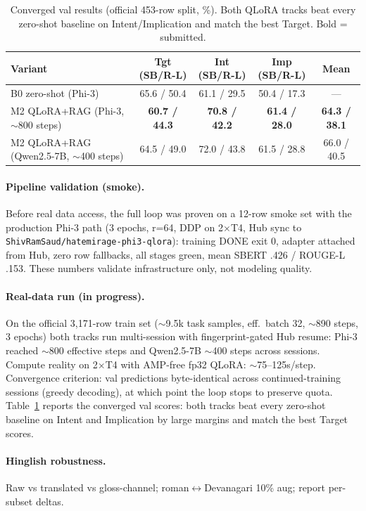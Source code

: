 \documentclass[11pt]{article}
\begin{document}
\begin{table}[t]
\centering
\small
\begin{tabular}{lcccc}
\toprule
Variant & Tgt (SB/R-L) & Int (SB/R-L) & Imp (SB/R-L) & Mean \\
\midrule
B0 zero-shot (Phi-3) & 65.6 / 50.4 & 61.1 / 29.5 & 50.4 / 17.3 & --- \\
M2 QLoRA+RAG (Phi-3, $\sim$800 steps) & \textbf{60.7 / 44.3} & \textbf{70.8 / 42.2} & \textbf{61.4 / 28.0} & \textbf{64.3 / 38.1} \\
M2 QLoRA+RAG (Qwen2.5-7B, $\sim$400 steps) & 64.5 / 49.0 & 72.0 / 43.8 & 61.5 / 28.8 & 66.0 / 40.5 \\
\bottomrule
\end{tabular}
\caption{Converged val results (official 453-row split, \%). Both QLoRA tracks beat every zero-shot baseline on Intent/Implication and match the best Target. Bold = submitted.}
\label{tab:abl}
\end{table}

\paragraph{Pipeline validation (smoke).}
Before real data access, the full loop was proven on a 12-row smoke set with the production Phi-3 path (3 epochs, r=64, DDP on 2$\times$T4, Hub sync to \texttt{ShivRamSaud/hatemirage-phi3-qlora}): training DONE exit 0, adapter attached from Hub, zero row fallbacks, all stages green, mean SBERT .426 / ROUGE-L .153. These numbers validate infrastructure only, not modeling quality.

\paragraph{Real-data run (in progress).}
On the official 3,171-row train set ($\sim$9.5k task samples, eff.\ batch 32, $\sim$890 steps, 3 epochs) both tracks run multi-session with fingerprint-gated Hub resume: Phi-3 reached $\sim$800 effective steps and Qwen2.5-7B $\sim$400 steps across sessions. Compute reality on 2$\times$T4 with AMP-free fp32 QLoRA: $\sim$75--125s/step. Convergence criterion: val predictions byte-identical across continued-training sessions (greedy decoding), at which point the loop stops to preserve quota. Table~\ref{tab:abl} reports the converged val scores: both tracks beat every zero-shot baseline on Intent and Implication by large margins and match the best Target scores.

\paragraph{Hinglish robustness.}
Raw vs translated vs gloss-channel; roman$\leftrightarrow$Devanagari 10\% aug; report per-subset deltas.
\end{document}
